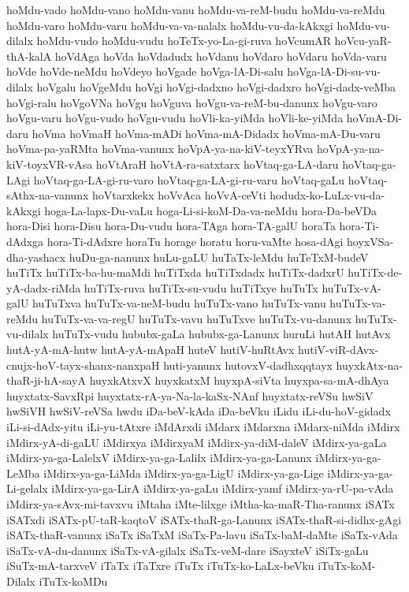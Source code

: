 {hoMdu-vado
hoMdu-vano
hoMdu-vanu
hoMdu-va-reM-budu
hoMdu-va-reMdu
hoMdu-varo
hoMdu-varu
hoMdu-va-va-nalalx
hoMdu-vu-da-kAkxgi
hoMdu-vu-dilalx
hoMdu-vudo
hoMdu-vudu
hoTeTx-yo-La-gi-ruva
hoVcumAR
hoVcu-yaR-thA-kalA
hoVdAga
hoVda
hoVdadudx
hoVdanu
hoVdaro
hoVdaru
hoVda-varu
hoVde
hoVde-neMdu
hoVdeyo
hoVgade
hoVga-lA-Di-salu
hoVga-lA-Di-su-vu-dilalx
hoVgalu
hoVgeMdu
hoVgi
hoVgi-dadxno
hoVgi-dadxro
hoVgi-dadx-veMba
hoVgi-ralu
hoVgoVNa
hoVgu
hoVguva
hoVgu-va-reM-bu-danunx
hoVgu-varo
hoVgu-varu
hoVgu-vudo
hoVgu-vudu
hoVli-ka-yiMda
hoVli-ke-yiMda
hoVmA-Di-daru
hoVma
hoVmaH
hoVma-mADi
hoVma-mA-Didadx
hoVma-mA-Du-varu
hoVma-pa-yaRMta
hoVma-vanunx
hoVpA-ya-na-kiV-teyxYRva
hoVpA-ya-na-kiV-toyxVR-vAsa
hoVtAraH
hoVtA-ra-satxtarx
hoVtaq-ga-LA-daru
hoVtaq-ga-LAgi
hoVtaq-ga-LA-gi-ru-varo
hoVtaq-ga-LA-gi-ru-varu
hoVtaq-gaLu
hoVtaq-sAthx-na-vanunx
hoVtarxkekx
hoVvAca
hoVvA-ceVti
hodudx-ko-LuLx-vu-da-kAkxgi
hoga-La-lapx-Du-vaLu
hoga-Li-si-koM-Da-va-neMdu
hora-Da-beVDa
hora-Disi
hora-Disu
hora-Du-vudu
hora-TAga
hora-TA-galU
horaTa
hora-Ti-dAdxga
hora-Ti-dAdxre
horaTu
horage
horatu
horu-vaMte
hosa-dAgi
hoyxVSa-dha-yashacx
huDu-ga-nanunx
huLu-gaLU
huTaTx-leMdu
huTeTxM-budeV
huTiTx
huTiTx-ba-hu-maMdi
huTiTxda
huTiTxdadx
huTiTx-dadxrU
huTiTx-de-yA-dadx-riMda
huTiTx-ruva
huTiTx-su-vudu
huTiTxye
huTuTx
huTuTx-vA-galU
huTuTxva
huTuTx-va-neM-budu
huTuTx-vano
huTuTx-vanu
huTuTx-va-reMdu
huTuTx-va-va-regU
huTuTx-vavu
huTuTxve
huTuTx-vu-danunx
huTuTx-vu-dilalx
huTuTx-vudu
hububx-gaLa
hububx-ga-Lanunx
huruLi
hutAH
hutAvx
hutA-yA-mA-hutw
hutA-yA-mApaH
huteV
hutiV-huRtAvx
hutiV-viR-dAvx-cnujx-hoV-tayx-shanx-nanxpaH
huti-yanunx
hutovxV-dadhxqqtayx
huyxkAtx-na-thaR-ji-hA-sayA
huyxkAtxvX
huyxkatxM
huyxpA-siVta
huyxpa-sa-mA-dhAya
huyxtatx-SavxRpi
huyxtatx-rA-ya-Na-la-kaSx-NAnf
huyxtatx-reVSu
hwSiV
hwSiVH
hwSiV-reVSa
hwdu
iDa-beV-kAda
iDa-beVku
iLidu
iLi-du-hoV-gidadx
iLi-si-dAdx-yitu
iLi-yu-tAtxre
iMdArxdi
iMdarx
iMdarxna
iMdarx-niMda
iMdirx
iMdirx-yA-di-gaLU
iMdirxya
iMdirxyaM
iMdirx-ya-diM-daleV
iMdirx-ya-gaLa
iMdirx-ya-ga-LalelxV
iMdirx-ya-ga-Lalilx
iMdirx-ya-ga-Lanunx
iMdirx-ya-ga-LeMba
iMdirx-ya-ga-LiMda
iMdirx-ya-ga-LigU
iMdirx-ya-ga-Lige
iMdirx-ya-ga-Li-gelalx
iMdirx-ya-ga-LirA
iMdirx-ya-gaLu
iMdirx-yamf
iMdirx-ya-rU-pa-vAda
iMdirx-ya-sAvx-mi-tavxvu
iMtaha
iMte-lilxge
iMtha-ka-maR-Tha-ranunx
iSATx
iSATxdi
iSATx-pU-taR-kaqtoV
iSATx-thaR-ga-Lanunx
iSATx-thaR-si-didhx-gAgi
iSATx-thaR-vanunx
iSaTx
iSaTxM
iSaTx-Pa-lavu
iSaTx-baM-daMte
iSaTx-vAda
iSaTx-vA-du-danunx
iSaTx-vA-gilalx
iSaTx-veM-dare
iSayxteV
iSiTx-gaLu
iSuTx-mA-tarxveV
iTaTx
iTaTxre
iTuTx
iTuTx-ko-LaLx-beVku
iTuTx-koM-Dilalx
iTuTx-koMDu
}
